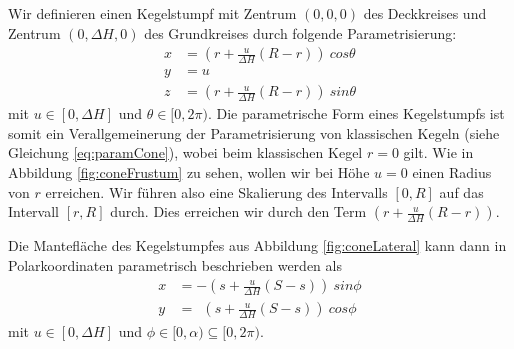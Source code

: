 Wir definieren einen Kegelstumpf mit Zentrum $(0,0,0)$ des Deckkreises und Zentrum $(0,\Delta H, 0)$ des Grundkreises durch folgende Parametrisierung:
\begin{equation} \label{eq:paramFrustum}
\begin{aligned}
x &= (r + \frac{u}{\Delta H} (R - r))~cos \theta \\
y &= u \\
z &= (r + \frac{u}{\Delta H} (R - r))~sin \theta
\end{aligned}
\end{equation}
mit $u\in [0, \Delta H]$ und $\theta \in [0, 2\pi)$. Die parametrische Form eines Kegelstumpfs ist somit ein Verallgemeinerung der Parametrisierung von klassischen Kegeln (siehe Gleichung \ref{eq:paramCone}), wobei beim klassischen Kegel $r = 0$ gilt. Wie in Abbildung \ref{fig:coneFrustum} zu sehen, wollen wir bei Höhe $u=0$ einen Radius von $r$ erreichen. Wir führen also eine Skalierung des Intervalls $[0, R]$ auf das Intervall $[r, R]$ durch. Dies erreichen wir durch den Term $(r + \frac{u}{\Delta H} (R - r))$. \bigskip



Die Mantefläche des Kegelstumpfes aus Abbildung \ref{fig:coneLateral} kann dann in Polarkoordinaten parametrisch beschrieben werden als
\begin{equation} \label{eq:paramLateral}
\begin{aligned}
x &= -(s + \frac{u}{\Delta H}(S-s)) ~sin \phi \\
y &= ~~(s + \frac{u}{\Delta H} (S-s)) ~cos \phi
\end{aligned}
\end{equation}
mit  $u\in [0, \Delta H]$ und $\phi \in [0, \alpha) \subseteq [0, 2\pi)$.

